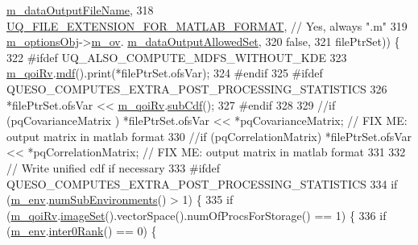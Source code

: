 \begin{DoxyCode}
      \hyperlink{class_q_u_e_s_o_1_1_sfp_options_values_ad6028c5dff00b18d5085045c3a6d135e}{m\_dataOutputFileName},
318                            \hyperlink{_defines_8h_ac440026eff7deb1c1eed1eea0e8e36ba}{UQ\_FILE\_EXTENSION\_FOR\_MATLAB\_FORMAT}, \textcolor{comment}{// Yes,
       always ".m"}
319                            \hyperlink{class_q_u_e_s_o_1_1_statistical_forward_problem_a4c286957fda7c134718422d9d4e4f1ca}{m\_optionsObj}->\hyperlink{class_q_u_e_s_o_1_1_statistical_forward_problem_options_a87ad4acd32801ea3edd5e65ffb093dbf}{m\_ov}.
      \hyperlink{class_q_u_e_s_o_1_1_sfp_options_values_a51d0f0da7a29dfb12340d863e2f980a0}{m\_dataOutputAllowedSet},
320                            \textcolor{keyword}{false},
321                            filePtrSet)) \{
322 \textcolor{preprocessor}{#ifdef UQ\_ALSO\_COMPUTE\_MDFS\_WITHOUT\_KDE}
323 \textcolor{preprocessor}{}    \hyperlink{class_q_u_e_s_o_1_1_statistical_forward_problem_aa9ce415e5be95e04d6eea53c48fdea2c}{m\_qoiRv}.\hyperlink{class_q_u_e_s_o_1_1_base_vector_r_v_a81f6ade1c28022b813d1276f2c217404}{mdf}().print(*filePtrSet.ofsVar);
324 \textcolor{preprocessor}{#endif}
325 \textcolor{preprocessor}{}\textcolor{preprocessor}{#ifdef QUESO\_COMPUTES\_EXTRA\_POST\_PROCESSING\_STATISTICS}
326 \textcolor{preprocessor}{}    *filePtrSet.ofsVar << \hyperlink{class_q_u_e_s_o_1_1_statistical_forward_problem_aa9ce415e5be95e04d6eea53c48fdea2c}{m\_qoiRv}.\hyperlink{class_q_u_e_s_o_1_1_base_vector_r_v_a905586dc1529a3ae7dd7f04313ca9e8a}{subCdf}();
327 \textcolor{preprocessor}{#endif}
328 \textcolor{preprocessor}{}
329     \textcolor{comment}{//if (pqCovarianceMatrix ) *filePtrSet.ofsVar << *pqCovarianceMatrix;  // FIX ME: output matrix in
       matlab format}
330     \textcolor{comment}{//if (pqCorrelationMatrix) *filePtrSet.ofsVar << *pqCorrelationMatrix; // FIX ME: output matrix in
       matlab format}
331 
332     \textcolor{comment}{// Write unified cdf if necessary}
333 \textcolor{preprocessor}{#ifdef QUESO\_COMPUTES\_EXTRA\_POST\_PROCESSING\_STATISTICS}
334 \textcolor{preprocessor}{}    \textcolor{keywordflow}{if} (\hyperlink{class_q_u_e_s_o_1_1_statistical_forward_problem_ab8dc530366735e9ca11290e37f95996a}{m\_env}.\hyperlink{class_q_u_e_s_o_1_1_base_environment_ac0345f57e31ef7833e379ed972bd094d}{numSubEnvironments}() > 1) \{
335       \textcolor{keywordflow}{if} (\hyperlink{class_q_u_e_s_o_1_1_statistical_forward_problem_aa9ce415e5be95e04d6eea53c48fdea2c}{m\_qoiRv}.\hyperlink{class_q_u_e_s_o_1_1_base_vector_r_v_aa4dd2f036228eac1f945bacc7147a922}{imageSet}().vectorSpace().numOfProcsForStorage() == 1) \{
336         \textcolor{keywordflow}{if} (\hyperlink{class_q_u_e_s_o_1_1_statistical_forward_problem_ab8dc530366735e9ca11290e37f95996a}{m\_env}.\hyperlink{class_q_u_e_s_o_1_1_base_environment_ae106b5bb8a80b655b88b3a26b1e7c185}{inter0Rank}() == 0) \{

\end{DoxyCode}
